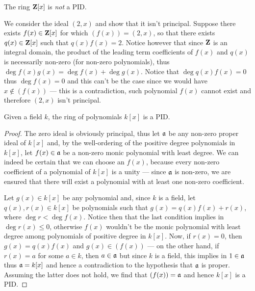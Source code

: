\begin{example}
\label{exp:Z[x]-isnt-PID}
The ring \(\mathbf{Z}[x]\) is \emph{not} a PID.

We consider the ideal \((2, x)\) and show that it isn't principal. Suppose there
exists \(f(x) \in \mathbf{Z}[x]\) for which \((f(x)) = (2, x)\), so that there exists
\(q(x) \in \mathbf{Z}[x]\) such that \(q(x) f(x) = 2\). Notice however that since \(\mathbf{Z}\)
is an integral domain, the product of the leading term coefficients of \(f(x)\)
and \(q(x)\) is necessarily non-zero (for non-zero polynomials), thus
\(\deg f(x) g(x) = \deg f(x) + \deg g(x)\). Notice that \(\deg q(x) f(x) = 0\)
thus \(\deg f(x) = 0\) and this can't be the case since we would have
\(x \notin (f(x))\) --- this is a contradiction, such polynomial \(f(x)\) cannot
exist and therefore \((2, x)\) isn't principal.
\end{example}

\begin{proposition}
\label{prop:k[x]-is-PID}
Given a field \(k\), the ring of polynomials \(k[x]\) is a PID.
\end{proposition}

\begin{proof}
The zero ideal is obviously principal, thus let \(\mathfrak{a}\) be any non-zero
proper ideal of \(k[x]\) and, by the well-ordering of the positive degree
polynomials in \(k[x]\), let \(f(x) \in \mathfrak{a}\) be a non-zero monic
polynomial with least degree.  We can indeed be certain that we can choose an
\(f(x)\), because every non-zero coefficient of a polynomial of \(k[x]\) is a
unity --- since \(\mathfrak{a}\) is non-zero, we are ensured that there will exist
a polynomial with at least one non-zero coefficient.

Let \(g(x) \in k[x]\) be any polynomial and, since \(k\) is a field, let
\(q(x), r(x) \in k[x]\) be polynomials such that \(g(x) = q(x) f(x) + r(x)\),
where \(\deg r < \deg f(x)\). Notice then that the last condition implies in
\(\deg r(x) \leq 0\), otherwise \(f(x)\) wouldn't be the monic polynomial with
least degree among polynomials of positive degree in \(k[x]\). Now, if
\(r(x) = 0\), then \(g(x) = q(x) f(x)\) and \(g(x) \in (f(x))\) --- on the other
hand, if \(r(x) = a\) for some \(a \in k\), then \(a \in \mathfrak{a}\) but since
\(k\) is a field, this implies in \(1 \in \mathfrak{a}\) thus \(\mathfrak{a} = k[x]\)
and hence a contradiction to the hypothesis that \(\mathfrak{a}\) is
proper. Assuming the latter does not hold, we find that \((f(x)) = \mathfrak{a}\)
and hence \(k[x]\) is a PID.
\end{proof}

